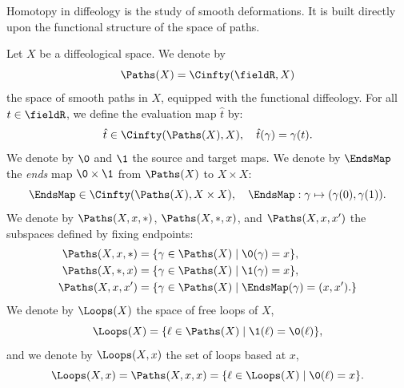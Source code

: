 \begin{article}
  Homotopy in diffeology is the study of smooth deformations.
  It is built directly upon the functional structure of the space of paths.
  
  Let $X$ be a diffeological space.
  We denote by
  $$
    \Paths(X) = \Cinfty(\fieldR,X)
    $$%
  the space of smooth paths in $X$,
  equipped with the functional diffeology.
  For all $t \in \fieldR$,
  we define the evaluation map $\hat t$ by:
  $$
    \hat t \in \Cinfty(\Paths(X), X),
    \quad
    \hat t(\gamma) = \gamma(t).
    $$%
  We denote by $\0$ and $\1$ the source and target maps.
  We denote by $\EndsMap$ the \emph{ends} map $\0 \times \1$ from $\Paths(X)$ to $X \times X$:
  $$
    \EndsMap \in \Cinfty(\Paths(X), X \times X),
    \quad
    \EndsMap : \gamma \mapsto (\gamma(0),\gamma(1)).
    $$%
  We denote by $\Paths(X,x,\ast)$,
  $\Paths(X,\ast,x)$,
  and $\Paths(X,x,x')$ the subspaces defined by fixing endpoints:
  \begin{align*}
    \Paths(X,x,\ast) &= \{ \gamma \in \Paths(X) \mid \0(\gamma) = x \},\\
    \Paths(X,\ast,x) &= \{ \gamma \in \Paths(X) \mid \1(\gamma) = x \},\\
    \Paths(X,x,x') &= \{ \gamma \in \Paths(X) \mid \EndsMap(\gamma) = (x,x'). \}
  \end{align*}
  We denote by $\Loops(X)$ the space of free loops of $X$,
  $$
    \Loops(X) = \{ \ell \in \Paths(X) \mid \1(\ell)=\0(\ell) \},
    $$%
  and we denote by $\Loops(X,x)$ the set of loops based at $x$,
  $$
    \Loops(X,x) = \Paths(X,x,x) = \{ \ell \in \Loops(X) \mid \0(\ell) = x \}.
    $$%
\end{article}

